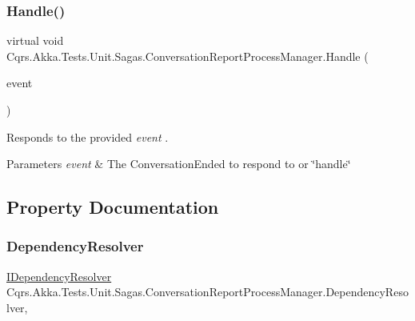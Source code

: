 \subsubsection{\texorpdfstring{Handle()}{Handle()}\hspace{0.1cm}{\footnotesize\ttfamily [3/3]}}
{\footnotesize\ttfamily virtual void Cqrs.\+Akka.\+Tests.\+Unit.\+Sagas.\+Conversation\+Report\+Process\+Manager.\+Handle (\begin{DoxyParamCaption}\item[{\hyperlink{classCqrs_1_1Akka_1_1Tests_1_1Unit_1_1Events_1_1ConversationEnded}{Conversation\+Ended} @}]{event }\end{DoxyParamCaption})\hspace{0.3cm}{\ttfamily [virtual]}}



Responds to the provided {\itshape event} . 


\begin{DoxyParams}{Parameters}
{\em event} & The Conversation\+Ended to respond to or \char`\"{}handle\char`\"{}\\
\hline
\end{DoxyParams}


\subsection{Property Documentation}
\mbox{\label{classCqrs_1_1Akka_1_1Tests_1_1Unit_1_1Sagas_1_1ConversationReportProcessManager_a6ddc3cab5bedf62389eaa4c769441aa8_a6ddc3cab5bedf62389eaa4c769441aa8}} 
\subsubsection{\texorpdfstring{Dependency\+Resolver}{DependencyResolver}}
{\footnotesize\ttfamily \hyperlink{interfaceCqrs_1_1Configuration_1_1IDependencyResolver}{I\+Dependency\+Resolver} Cqrs.\+Akka.\+Tests.\+Unit.\+Sagas.\+Conversation\+Report\+Process\+Manager.\+Dependency\+Resolver\hspace{0.3cm}{\ttfamily [get]}, {\ttfamily [protected]}}



